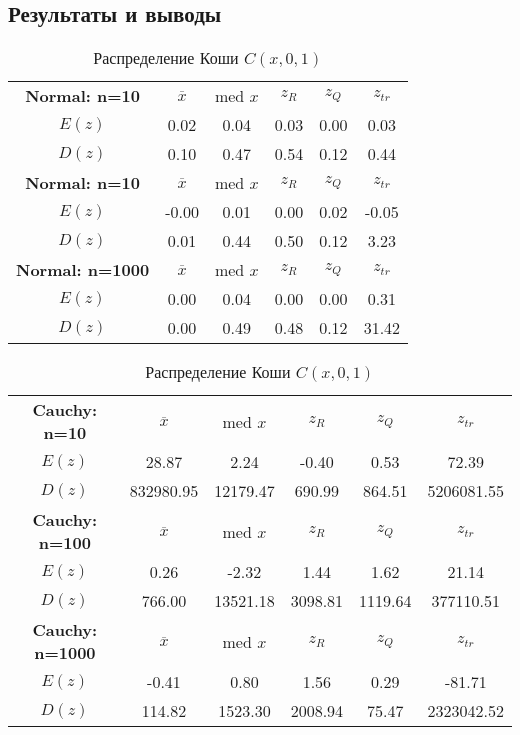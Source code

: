\documentclass[14pt]{extarticle}
\begin{document}
\subsection{Результаты и выводы}

\begin{table}[htbp]
    \centering
    \begin{tabular}{|c|c|c|c|c|c|}
        \toprule
        \textbf{Normal: n=10} & \(\overline{x}\) & med \(x\) & \(z_R\) & \(z_Q\) & \(z_{tr}\)\\
        \(E(z)\) & 0.02 & 0.04 & 0.03 & 0.00 & 0.03  \\
        \(D(z)\) & 0.10 & 0.47 & 0.54 & 0.12 & 0.44 \\
        \midrule
  	\textbf{Normal: n=10} & \(\overline{x}\) & med \(x\) & \(z_R\) & \(z_Q\) & \(z_{tr}\)\\
        \(E(z)\) & -0.00 & 0.01 & 0.00 & 0.02 & -0.05   \\
        \(D(z)\) & 0.01 & 0.44 & 0.50 & 0.12 & 3.23 \\
        \midrule
	\textbf{Normal: n=1000} & \(\overline{x}\) & med \(x\) & \(z_R\) & \(z_Q\) & \(z_{tr}\)\\
        \(E(z)\) & 0.00 & 0.04 & 0.00 & 0.00 & 0.31   \\
        \(D(z)\) &  0.00 & 0.49 & 0.48 & 0.12 & 31.42 \\
        \toprule
    \end{tabular}
    \caption{Распределение Коши \(C(x, 0, 1)\)}
    \label{tab:cauchy_t}
\end{table}

\begin{table}[htbp]
    \centering
    \begin{tabular}{|c|c|c|c|c|c|}
        \toprule
        \textbf{Cauchy: n=10} & \(\overline{x}\) & med \(x\) & \(z_R\) & \(z_Q\) & \(z_{tr}\)\\
        \(E(z)\) & 28.87 & 2.24 & -0.40 & 0.53 & 72.39  \\
        \(D(z)\) & 832980.95 & 12179.47 & 690.99 & 864.51 & 5206081.55 \\
        \midrule
  	\textbf{Cauchy: n=100} & \(\overline{x}\) & med \(x\) & \(z_R\) & \(z_Q\) & \(z_{tr}\)\\
        \(E(z)\) & 0.26 & -2.32 & 1.44 & 1.62 & 21.14    \\
        \(D(z)\) & 766.00 & 13521.18 & 3098.81 & 1119.64 & 377110.51 \\
        \midrule
	\textbf{Cauchy: n=1000} & \(\overline{x}\) & med \(x\) & \(z_R\) & \(z_Q\) & \(z_{tr}\)\\
        \(E(z)\) & -0.41 & 0.80 & 1.56 & 0.29 & -81.71    \\
        \(D(z)\) & 114.82 & 1523.30 & 2008.94 & 75.47 & 2323042.52 \\
        \toprule
    \end{tabular}
    \caption{Распределение Коши \(C(x, 0, 1)\)}
    \label{tab:cauchy_t}
\end{table}
\end{document}
